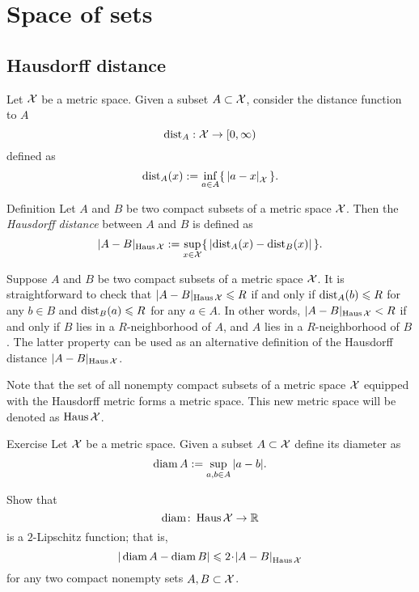 \chapter{Space of sets}

\section{Hausdorff distance}

Let $\mathcal{X}$ be a metric space.
Given a subset $A\subset \mathcal{X}$,
consider the distance function to $A$
$$\mathrm{dist}_A: \mathcal{X} \to [0,\infty)$$
defined as 
$$\distfun_A(x)
\df
\inf_{a\in A}\{\,\dist ax{\spc{X}}\,\}.$$

\begin{thm}{Definition}\label{def:hausdorff-convergence}
Let $A$ and $B$ be two compact subsets of a metric space $\mathcal{X}$.
Then the \emph{Hausdorff distance} between $A$ and $B$ is defined as 
$$|A-B|_{\operatorname{\rm Haus}\nolimits\mathcal{X}}
\mathrel{:=}
\sup_{x\in \mathcal{X}}\{\,|\mathrm{dist}_A(x)-\mathrm{dist}_B(x)|\,\}.
$$

\end{thm}
 
Suppose $A$ and $B$ be two compact subsets of a metric space $\mathcal{X}$.
It is straightforward to check that $|A-B|_{\operatorname{\rm Haus}\nolimits\mathcal{X}}\leqslant R$ if and only if 
$\mathrm{dist}_A(b)\leqslant R$ for any $b\in B$
and 
$\mathrm{dist}_B(a)\leqslant R$ for any $a\in A$.
In other words, $|A-B|_{\operatorname{\rm Haus}\nolimits\mathcal{X}}< R$ if and only if 
$B$ lies in a $R$-neighborhood of $A$, 
and 
$A$ lies in a $R$-neighborhood of $B$.
The latter property can be used as an alternative definition of the Hausdorff distance $|A-B|_{\operatorname{\rm Haus}\nolimits\mathcal{X}}$.

Note that the set of all nonempty compact subsets of a metric space $\mathcal{X}$ equipped with the Hausdorff metric forms a metric space.
This new metric space will be denoted as $\operatorname{\rm Haus}\nolimits\mathcal{X}$.


\begin{thm}{Exercise}\label{ex:diam}
Let $\mathcal{X}$ be a metric space.
Given a subset $A\subset \mathcal{X}$ define its diameter as 
$$\operatorname{\rm diam}\nolimits A\mathrel{:=}\sup_{a,b\in A} |a-b|.$$

Show that 
$$\operatorname{\rm diam}\nolimits\colon\operatorname{\rm Haus}\nolimits\mathcal{X}\to \mathbb{R}$$ 
is a $2$-Lipschitz function;
that is,
\[|\diam A-\diam B|\le 2\cdot\dist{A}{B}{\Haus\spc{X}}\]
for any two compact nonempty sets $A,B\subset\mathcal{X}$.
\end{thm}


